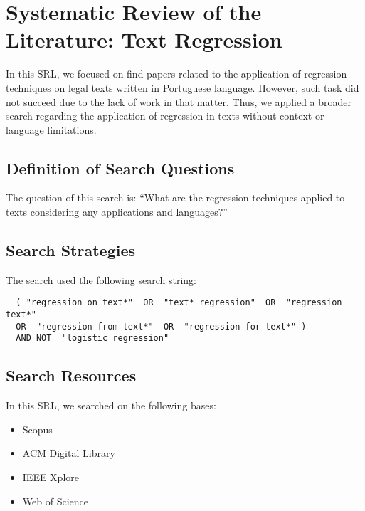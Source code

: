 \chapter{Systematic Review of the Literature: Text Regression}\label{ap:rsl_regression_law}

In this SRL, we focused on find papers related to the application of regression techniques on legal texts written in Portuguese language. However, such task did not succeed due to the lack of work in that matter. Thus, we applied a broader search regarding the application of regression in texts without context or language limitations.

\section{Definition of Search Questions}

The question of this search is: ``What are the regression techniques applied to texts considering any applications and languages?''

\section{Search Strategies}

The search used the following search string:

\begin{verbatim}
  ( "regression on text*"  OR  "text* regression"  OR  "regression text*"  
  OR  "regression from text*"  OR  "regression for text*" )  
  AND NOT  "logistic regression"  
\end{verbatim}



\section{Search Resources}
In this SRL, we searched on the following bases:

\begin{itemize}[noitemsep]
    \item Scopus
    \item ACM Digital Library
    \item IEEE Xplore
    \item Web of Science
\end{itemize}

